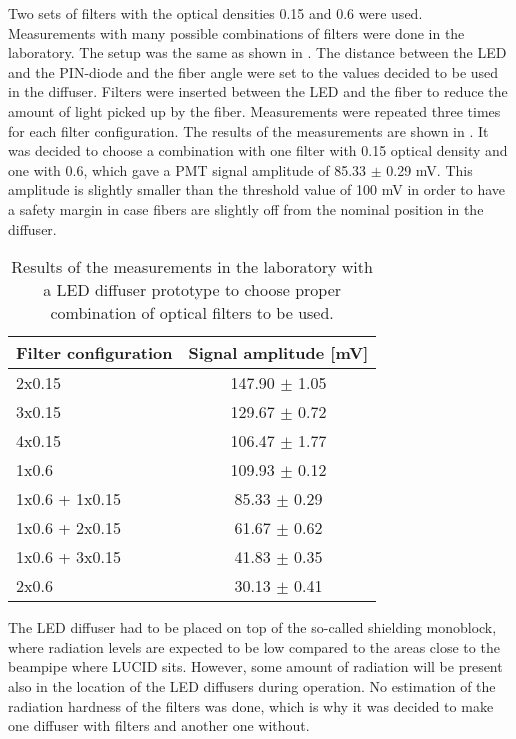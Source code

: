 Two sets of filters with the optical densities 0.15 and 0.6 were used. 
Measurements with many possible combinations of filters were done in the laboratory.
The setup was the same as shown in . The distance between the LED and the PIN-diode 
and the fiber angle were set to the values 
decided to be used in the diffuser. 
Filters were inserted between the LED and the fiber to reduce the amount of light picked up by the fiber.
Measurements were repeated three times for each filter configuration. The results of the measurements are shown in .
It was decided to choose a combination with one filter with 0.15 optical density and one with 0.6, which gave a PMT signal amplitude of 85.33 $\pm$ 0.29 mV.
This amplitude is slightly smaller than the threshold value of 100 mV in order to have a safety margin in case fibers 
are slightly off from the nominal position in the diffuser.

\begin{table}[bp]
  \begin{tabular}{l|c}
    Filter configuration & Signal amplitude [mV]\\
    \hline
    2x0.15       	&	147.90	$\pm$	1.05	\\
    3x0.15       	&	129.67	$\pm$	0.72	\\
    4x0.15       	&	106.47	$\pm$	1.77	\\
    1x0.6          	&	109.93	$\pm$	0.12	\\
    1x0.6 + 1x0.15 	&	85.33	$\pm$	0.29	\\
    1x0.6 + 2x0.15 	&	61.67	$\pm$	0.62	\\
    1x0.6 + 3x0.15 	&	41.83	$\pm$	0.35	\\
    2x0.6	        &	30.13	$\pm$	0.41	\\
  \end{tabular}
  \caption{Results of the measurements in the laboratory with a LED diffuser prototype to choose proper combination of optical filters to be used.}
  \label{tab:FilterChoice}
\end{table}

The LED diffuser had to be placed on top of the so-called shielding monoblock, where radiation levels are expected to be low compared to the areas 
close to the beampipe where LUCID sits.
However, some amount of radiation will be present also in the location of the LED diffusers during operation.
No estimation of the radiation hardness of the filters was done, which is why it was decided to make one diffuser with filters and another one without.

